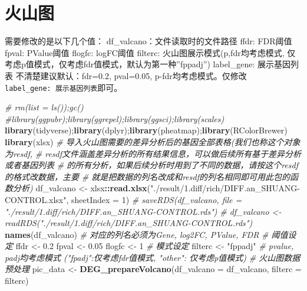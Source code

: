 \documentclass[
]{book}
\newenvironment{Shaded}{\begin{snugshade}}{\end{snugshade}}
\newcommand{\AttributeTok}[1]{\textcolor[rgb]{0.13,0.29,0.53}{#1}}
\newcommand{\CommentTok}[1]{\textcolor[rgb]{0.56,0.35,0.01}{\textit{#1}}}
\newcommand{\DecValTok}[1]{\textcolor[rgb]{0.00,0.00,0.81}{#1}}
\newcommand{\FloatTok}[1]{\textcolor[rgb]{0.00,0.00,0.81}{#1}}
\newcommand{\FunctionTok}[1]{\textcolor[rgb]{0.13,0.29,0.53}{\textbf{#1}}}
\newcommand{\NormalTok}[1]{#1}
\newcommand{\OtherTok}[1]{\textcolor[rgb]{0.56,0.35,0.01}{#1}}
\newcommand{\SpecialCharTok}[1]{\textcolor[rgb]{0.81,0.36,0.00}{\textbf{#1}}}
\newcommand{\StringTok}[1]{\textcolor[rgb]{0.31,0.60,0.02}{#1}}
\begin{document}
\hypertarget{deg-valcano}{%
\section{火山图}\label{deg-valcano}}

需要修改的是以下几个值：
df\_valcano：文件读取时的文件路径
ffdr: FDR阈值
fpval: PValue阈值
flogfc: logFC阈值
filterc: 火山图展示模式(p,fdr均考虑模式, 仅考虑p值模式，仅考虑fdr值模式，默认为第一种''fppadj'')
label\_gene: 展示基因列表
不清楚建议默认：fdr=0.2, pval=0.05, p-fdr均考虑模式。仅修改\texttt{label\_gene:\ 展示基因列表}即可。

\begin{Shaded}
\begin{Highlighting}[]
\CommentTok{\# rm(list = ls());gc()}
\CommentTok{\#library(ggpubr);library(ggrepel);library(ggsci);library(scales)}
\FunctionTok{library}\NormalTok{(tidyverse);}\FunctionTok{library}\NormalTok{(dplyr);}\FunctionTok{library}\NormalTok{(pheatmap);}\FunctionTok{library}\NormalTok{(RColorBrewer)}
\FunctionTok{library}\NormalTok{(xlsx)}
\CommentTok{\# 导入火山图需要的差异分析后的基因全部表格(我们也称这个对象为resdf,}
\CommentTok{\#  resdf文件涵盖差异分析的所有结果信息，可以做后续所有基于差异分析或者基因列表}
\CommentTok{\#  的所有分析，如果后续分析时用到了不同的数据，请按这个resdf的格式改数据，主要}
\CommentTok{\#  就是把数据的列名改成和resdf的列名相同即可用此包的函数分析)}
\NormalTok{df\_valcano }\OtherTok{\textless{}{-}}\NormalTok{ xlsx}\SpecialCharTok{::}\FunctionTok{read.xlsx}\NormalTok{(}\StringTok{"./result/1.diff/rich/DIFF.an\_SHUANG{-}CONTROL.xlsx"}\NormalTok{, }\AttributeTok{sheetIndex =} \DecValTok{1}\NormalTok{)}
\CommentTok{\# saveRDS(df\_valcano, file = "./result/1.diff/rich/DIFF.an\_SHUANG{-}CONTROL.rds")}
\CommentTok{\# df\_valcano \textless{}{-} readRDS("./result/1.diff/rich/DIFF.an\_SHUANG{-}CONTROL.rds")}
\FunctionTok{names}\NormalTok{(df\_valcano) }\CommentTok{\# 对应的列名必须为Gene, log2FC, PValue, FDR}
\CommentTok{\# 阈值设定}
\NormalTok{ffdr }\OtherTok{\textless{}{-}} \FloatTok{0.2}
\NormalTok{fpval }\OtherTok{\textless{}{-}} \FloatTok{0.05}
\NormalTok{flogfc }\OtherTok{\textless{}{-}} \DecValTok{1}
\CommentTok{\# 模式设定}
\NormalTok{filterc }\OtherTok{\textless{}{-}} \StringTok{"fppadj"} \CommentTok{\# pvalue, padj均考虑模式 ("fpadj":仅考虑fdr值模式, "other": 仅考虑p值模式)}
\CommentTok{\# 火山图数据预处理}
\NormalTok{pic\_data }\OtherTok{\textless{}{-}} \FunctionTok{DEG\_prepareVolcano}\NormalTok{(}\AttributeTok{df\_valcano =}\NormalTok{ df\_valcano, }\AttributeTok{filterc =}\NormalTok{ filterc)}


\end{Highlighting}
\end{Shaded}
\end{document}
